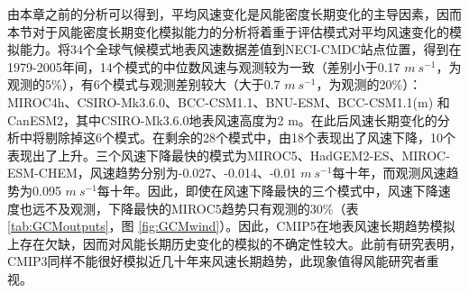 由本章之前的分析可以得到，平均风速变化是风能密度长期变化的主导因素，因而本节对于风能密度长期变化模拟能力的分析将着重于评估模式对平均风速变化的模拟能力。将34个全球气候模式地表风速数据差值到NECI-CMDC站点位置，得到在1979-2005年间，14个模式的中位数风速与观测较为一致（差别小于0.17 $m ~ s^{-1}$，为观测的5\%），有6个模式与观测差别较大（大于0.7 $m ~ s^{-1}$，为观测的20\%）：MIROC4h、CSIRO-Mk3.6.0、BCC-CSM1.1、BNU-ESM、BCC-CSM1.1(m) 和 CanESM2，其中CSIRO-Mk3.6.0地表风速高度为2 m。在此后风速长期变化的分析中将剔除掉这6个模式。在剩余的28个模式中，由18个表现出了风速下降，10个表现出了上升。三个风速下降最快的模式为MIROC5、HadGEM2-ES、MIROC-ESM-CHEM，风速趋势分别为-0.027、-0.014、-0.01 $m ~ s^{-1}$每十年，而观测风速趋势为0.095 $m ~ s^{-1}$每十年。因此，即使在风速下降最快的三个模式中，风速下降速度也远不及观测，下降最快的MIROC5趋势只有观测的30\%（表 \ref{tab:GCMoutputs}，图 \ref{fig:GCMwind}）。因此，CMIP5在地表风速长期趋势模拟上存在欠缺，因而对风能长期历史变化的模拟的不确定性较大。此前有研究表明，CMIP3同样不能很好模拟近几十年来风速长期趋势\citep{zongci2009evaluation}，此现象值得风能研究者重视。

